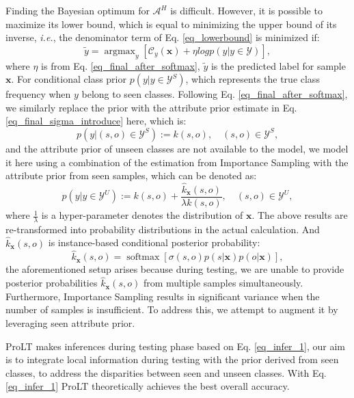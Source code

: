 \documentclass[letterpaper]{article} %
\newcommand{\mx}{\mathbf{x}}
\newcommand{\ie}{\textit{i.e.}}
\theoremstyle{definition}
\begin{document}
Finding the Bayesian optimum for $\mathcal{A}^{H}$ is difficult. However, it is possible to maximize its lower bound, which is equal to minimizing the upper bound of its inverse, \ie, the denominator term of Eq. \ref{eq_lowerbound} is minimized if:
\begin{equation}
		\tilde{y}=\operatorname{argmax}_{y}\left [\mathcal{C}_{y}(\mx)+\eta logp(y|y\in \mathcal{Y})\right ],
        \label{eq_infer_1}
	\end{equation}
where $\eta$ is from Eq. \ref{eq_final_after_softmax}, $\tilde{y}$ is the predicted label for sample $\mx$. For conditional class prior $p(y|y\in \mathcal{Y}^{S})$, which represents the true class frequency when $y$ belong to seen classes. Following Eq. \ref{eq_final_after_softmax}, we similarly replace the prior with the attribute prior estimate in Eq. \ref{eq_final_sigma_introduce} here, which is:
\begin{equation}
p(y | (s,o) \in \mathcal{Y}^{S}) := k(s,o), \quad (s,o) \in \mathcal{Y}^{S},
\label{eq_seen}
\end{equation}
and the attribute prior of unseen classes are not available to the model, we model it here using a combination of the estimation from Importance Sampling \cite{importancesampling} with the attribute prior from seen samples, which can be denoted as:
\begin{equation}
p(y|y\in \mathcal{Y}^{U}):=k(s,o)+\frac{\hat{k}_{\mx}(s,o)}{\lambda k(s,o)}, \quad (s,o) \in \mathcal{Y}^{U},
        \label{eq_importance}
	\end{equation}
where $\frac{1}{\lambda}$ is a hyper-parameter denotes the distribution of $\mx$. The above results are re-transformed into probability distributions in the actual calculation. And $\hat{k}_{\mx}(s,o)$ is instance-based conditional posterior probability:
\begin{equation}
\hat{k}_{\mx}(s,o)=\operatorname{softmax} \left [ \sigma(s,o)p(s|\mx)p(o|\mx)\right ],
        \label{eq_khat}
	\end{equation}
the aforementioned setup arises because during testing, we are unable to provide posterior probabilities $\hat{k}_{\mx}(s,o)$ from multiple samples simultaneously. Furthermore, Importance Sampling results in significant variance when the number of samples is insufficient. To address this, we attempt to augment it by leveraging seen attribute prior.
 
ProLT makes inferences during testing phase based on Eq. \ref{eq_infer_1}, our aim is to integrate local information during testing with the prior derived from seen classes, to address the disparities between seen and unseen classes. With Eq. \ref{eq_infer_1} ProLT theoretically achieves the best overall accuracy.
\end{document}
